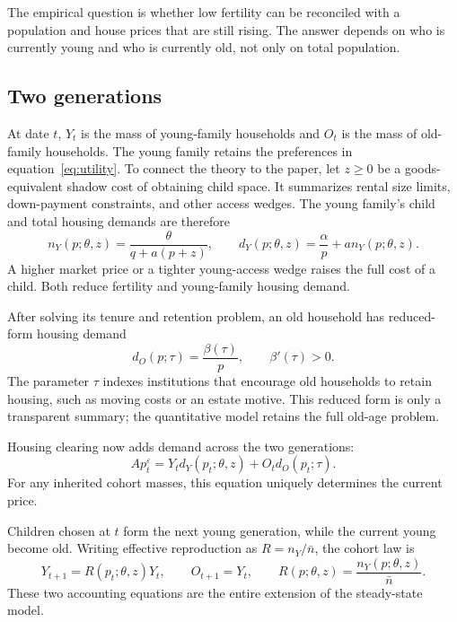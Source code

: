 \documentclass[11pt]{article}
\theoremstyle{definition}
\begin{document}
The empirical question is whether low fertility can be reconciled with a
population and house prices that are still rising. The answer depends on who
is currently young and who is currently old, not only on total population.

\subsection*{Two generations}

At date $t$, $Y_t$ is the mass of young-family households and $O_t$ is the mass
of old-family households. The young family retains the preferences in
equation~\eqref{eq:utility}. To connect the theory to the paper, let $z\geq0$
be a goods-equivalent shadow cost of obtaining child space. It summarizes
rental size limits, down-payment constraints, and other access wedges. The
young family's child and total housing demands are therefore
\begin{equation}
 n_Y(p;\theta,z)=\frac{\theta}{q+a(p+z)},
 \qquad
 d_Y(p;\theta,z)=\frac{\alpha}{p}+a n_Y(p;\theta,z).
 \label{eq:young_cohort_demands}
\end{equation}
A higher market price or a tighter young-access wedge raises the full cost of a
child. Both reduce fertility and young-family housing demand.

After solving its tenure and retention problem, an old household has reduced-form
housing demand
\begin{equation}
 d_O(p;\tau)=\frac{\beta(\tau)}{p},
 \qquad \beta'(\tau)>0.
 \label{eq:old_cohort_demand}
\end{equation}
The parameter $\tau$ indexes institutions that encourage old households to
retain housing, such as moving costs or an estate motive. This reduced form is
only a transparent summary; the quantitative model retains the full old-age
problem.

Housing clearing now adds demand across the two generations:
\begin{equation}
 A p_t^\varepsilon
 =Y_t d_Y(p_t;\theta,z)+O_t d_O(p_t;\tau).
 \label{eq:cohort_clearing}
\end{equation}
For any inherited cohort masses, this equation uniquely determines the current
price.

Children chosen at $t$ form the next young generation, while the current young
become old. Writing effective reproduction as $R=n_Y/\bar n$, the cohort law is
\begin{equation}
 Y_{t+1}=R(p_t;\theta,z)Y_t,
 \qquad O_{t+1}=Y_t,
 \qquad
 R(p;\theta,z)=\frac{n_Y(p;\theta,z)}{\bar n}.
 \label{eq:two_cohort_law}
\end{equation}
These two accounting equations are the entire extension of the steady-state
model.
\end{document}
